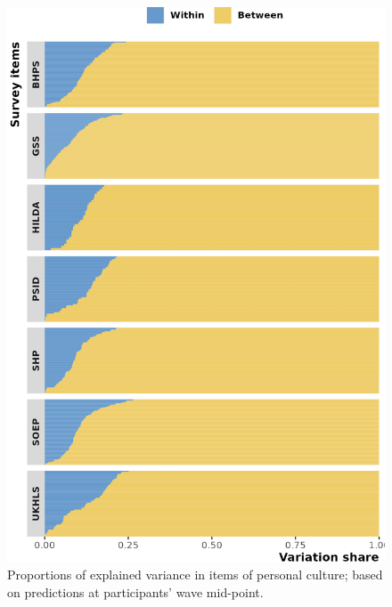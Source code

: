 \documentclass[
  11pt,
]{article}
\begin{document}
\begin{figure}

{\centering \includegraphics[width=20.71in]{fig/variation_share_lm_mdpnt} 

}

\caption{Proportions of explained variance in items of personal culture; based on predictions at participants' wave mid-point.}\label{fig:fig1}
\end{figure}
\end{document}
